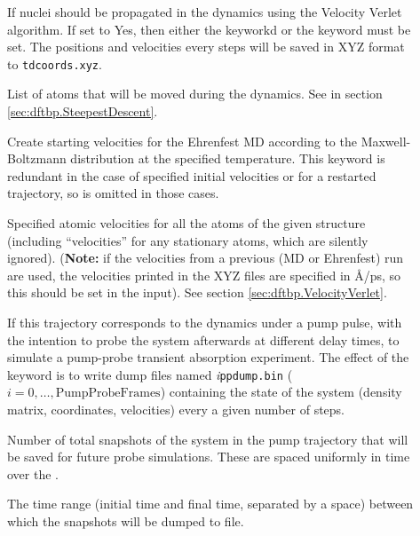 \begin{description}
\item[] If nuclei should be propagated in the dynamics
  using the Velocity Verlet algorithm. If set to Yes, then either the
   keyworkd or the  keyword must
  be set. The positions and velocities every  steps
  will be saved in XYZ format to \verb|tdcoords.xyz|.

\item[] List of atoms that will be moved during the
  dynamics. See  in section
  \ref{sec:dftbp.SteepestDescent}.

\item[] Create starting
  velocities for the Ehrenfest MD according to the Maxwell-Boltzmann
  distribution at the specified temperature. This keyword is redundant in the
  case of specified initial velocities or for a restarted trajectory, so is
  omitted in those cases.

\item[] Specified atomic
  velocities for all the atoms of the given structure (including
  ``velocities'' for any stationary atoms, which are silently
  ignored). (\textbf{Note:} if the velocities from a previous (MD or
  Ehrenfest) run are used, the velocities printed in the XYZ files are
  specified in {\AA}/ps, so this should be set in the input). See
  section \ref{sec:dftbp.VelocityVerlet}.

\item[] If this trajectory corresponds to the dynamics under
  a pump pulse, with the intention to probe the system afterwards at
  different delay times, to simulate a pump-probe transient absorption
  experiment. The effect of the keyword is to write dump files named
  \textit{i}\verb|ppdump.bin| ($i=0,\dots,\mathrm{PumpProbeFrames}$)
  containing the state of the system (density matrix, coordinates,
  velocities) every a given number of steps.

\item[] Number of total snapshots of the system in
  the pump trajectory that will be saved for future probe
  simulations. These are spaced uniformly in time over the
  .

\item[] The time range
  (initial time and final time, separated by a space) between which
  the snapshots will be dumped to file.


\end{description}
